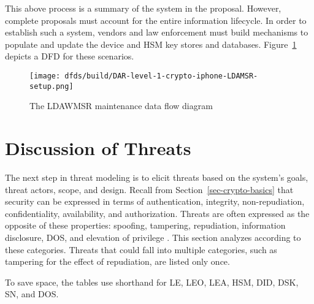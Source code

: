 \documentclass[manuscript,screen,review]{acmart}
\newcommand{\myfig}[1]{Figure~\ref{#1}}
\newcommand{\mysec}[1]{Section~\ref{#1}}
\renewcommand*{\thead}[1]{\multicolumn{1}{c}{\bfseries \makecell{#1}}}
\begin{document}
This above process is a summary of the system in the \ldawmsr proposal. However, complete proposals must account for the
entire information lifecycle. In order to establish such a system, vendors and law enforcement must build mechanisms to
populate and update the device and \ac{HSM} key stores and databases. \myfig{fig-dfd-ldawmsr-setup} depicts a \ac{DFD}
for these scenarios.

\begin{figure}[H]
  \centering
  \texttt{[image: dfds/build/DAR-level-1-crypto-iphone-LDAMSR-setup.png]}
  \caption{The LDAWMSR maintenance data flow diagram}
  \label{fig-dfd-ldawmsr-setup}
\end{figure}


\section{Discussion of Threats}
\label{sec-prop-threats}

The next step in threat modeling is to elicit threats based on the system's goals, threat actors, scope, and design.
Recall from \mysec{sec-crypto-basics} that security can be expressed in terms of authentication, integrity,
non-repudiation, confidentiality, availability, and authorization. Threats are often expressed as the opposite of these
properties: spoofing, tampering, repudiation, information disclosure, \acl{DOS}, and elevation of privilege
\cite{shostack_threat_2014}. This section analyzes \ldawmsr according to these categories. Threats that could fall into
multiple categories, such as tampering for the effect of repudiation, are listed only once.

To save space, the tables use shorthand for \acf{LE}, \acf{LEO}, \acf{LEA}, \acf{HSM}, \acf{DID}, \acf{DSK}, \acf{SN},
and \acf{DOS}.

\newcommand{\threattablesettings}{\FlushLeft \small}

\newcommand{\threattablebegin}[3]{
  \begin{FlushLeft}
    \small
    \singlespacing
    \begin{longtable}{ lp{3cm}p{5.2cm}p{6cm} }
      \caption{#1 Threats}
      \label{table-#2}
      \\ \toprule
      \thead{ID} & \thead{#3} & \thead{Effect} & \thead{Mitigation}
      \\ \midrule
      \endfirsthead
      \caption[]{#1 Threats (continued)}
      \\
      \toprule
      \thead{ID} & \thead{#3} & \thead{Effect} & \thead{Mitigation}
      \\
      \endhead
      \endfoot
      \bottomrule
      \endlastfoot
}
\end{document}
